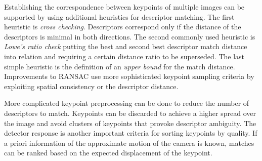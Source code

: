 Establishing the correspondence between keypoints of multiple images can be supported by using additional heuristics for descriptor matching.
The first heuristic is \emph{cross checking}.
Descriptors correspond only if the distance of the descriptors is minimal in both directions.
The second commonly used heuristic is \emph{Lowe's ratio check}\cite{lowe_ijcv04} putting the best and second best descriptor match distance into relation and requiring a certain distance ratio to be superseded.
The last simple heuristic is the definition of an \emph{upper bound} for the match distance.
Improvements to \acrshort{RANSAC}\cite{sattler_iccv2009,chum_cvpr2005} use more sophisticated keypoint sampling criteria by exploiting spatial consistency or the descriptor distance.

More complicated keypoint preprocessing can be done to reduce the number of descriptors to match.
Keypoints can be discarded to achieve a higher spread over the image and avoid clusters of keypoints that provoke descriptor ambiguity.
The detector response is another important criteria for sorting keypoints by quality.
If a priori information of the approximate motion of the camera is known, matches can be ranked based on the expected displacement of the keypoint.
